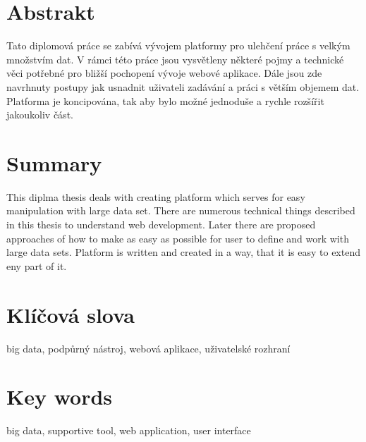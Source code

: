 \documentclass[12pt,oneside,a4paper]{report}
\newcommand\blankpage{
    \null
    \thispagestyle{empty}
    \newpage
}
\begin{document}
\afterpage{\blankpage}

\pagestyle{empty}



\section*{Abstrakt}
Tato diplomová práce se zabívá vývojem platformy pro ulehčení práce s velkým množstvím dat. V rámci této práce jsou vysvětleny některé pojmy a technické věci potřebné pro bližší pochopení vývoje webové aplikace. Dále jsou zde navrhnuty postupy jak usnadnit uživateli zadávání a práci s větším objemem dat. Platforma je koncipována, tak aby bylo možné jednoduše a rychle rozšířit jakoukoliv část.
\section*{Summary}
This diplma thesis deals with creating platform which serves for easy manipulation with large data set. There are numerous technical things described in this thesis to understand web development. Later there are proposed approaches of how to make as easy as possible for user to define and work with large data sets. Platform is written and created in a way, that it is easy to extend eny part of it.

\hbox{}
\vfill

\section*{Klíčová slova}
big data, podpůrný nástroj, webová aplikace, uživatelské rozhraní
\section*{Key words}
big data, supportive tool, web application, user interface
\vskip1cm
\end{document}
